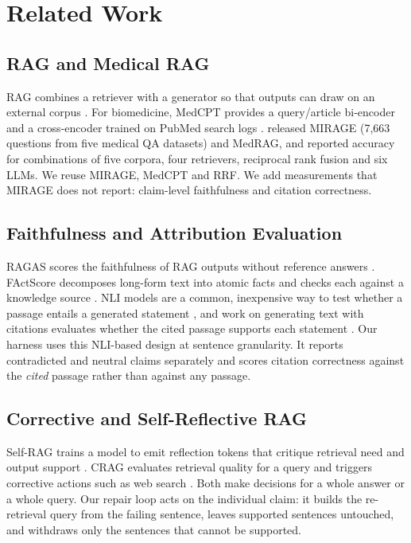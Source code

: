 \documentclass[11pt]{article}
\begin{document}
\section{Related Work}
\subsection{RAG and Medical RAG}
RAG combines a retriever with a generator so that outputs can draw on an external corpus \citep{lewis2020rag}. For biomedicine, MedCPT provides a query/article bi-encoder and a cross-encoder trained on PubMed search logs \citep{jin2023medcpt}. \citet{xiong2024benchmarking} released MIRAGE (7,663 questions from five medical QA datasets) and MedRAG, and reported accuracy for combinations of five corpora, four retrievers, reciprocal rank fusion \citep[RRF;][]{cormack2009rrf} and six LLMs. We reuse MIRAGE, MedCPT and RRF. We add measurements that MIRAGE does not report: claim-level faithfulness and citation correctness.

\subsection{Faithfulness and Attribution Evaluation}
RAGAS scores the faithfulness of RAG outputs without reference answers \citep{es2024ragas}. FActScore decomposes long-form text into atomic facts and checks each against a knowledge source \citep{min2023factscore}. NLI models are a common, inexpensive way to test whether a passage entails a generated statement \citep[e.g.,][]{TODO_true_nli_factuality}, and work on generating text with citations evaluates whether the cited passage supports each statement \citep{TODO_alce_citations}. Our harness uses this NLI-based design at sentence granularity. It reports contradicted and neutral claims separately and scores citation correctness against the \emph{cited} passage rather than against any passage.

\subsection{Corrective and Self-Reflective RAG}
Self-RAG trains a model to emit reflection tokens that critique retrieval need and output support \citep{asai2024selfrag}. CRAG evaluates retrieval quality for a query and triggers corrective actions such as web search \citep{yan2024crag}. Both make decisions for a whole answer or a whole query. Our repair loop acts on the individual claim: it builds the re-retrieval query from the failing sentence, leaves supported sentences untouched, and withdraws only the sentences that cannot be supported.
\end{document}
